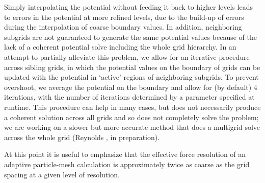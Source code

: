 Simply interpolating the potential without feeding it back to higher levels leads to errors in the potential at more refined levels, due to the build-up of errors during the interpolation of coarse boundary values.  In addition, neighboring subgrids are not guaranteed to generate the same potential values because of the lack of a coherent potential solve including the whole grid hierarchy.  In an attempt to partially alleviate this problem, we allow for an iterative procedure across sibling grids, in which the potential values on the boundary of grids can be updated with the potential in `active' regions of neighboring subgrids.  To prevent overshoot, we average the potential on the boundary and allow for (by default) 4 iterations, with the number of iterations determined by a parameter specified at runtime.  This procedure can help in many cases, but does not necessarily produce a coherent solution across all grids and so does not completely solve the problem; we are working on a slower but more accurate method that does a multigrid solve across the whole grid (Reynolds \etal, in preparation).

At this point it is useful to emphasize that the effective force resolution of an adaptive particle-mesh calculation is approximately twice as coarse as the grid spacing at a given level of resolution.
